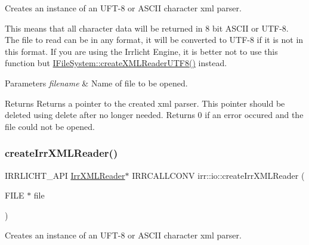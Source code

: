 Creates an instance of an U\+F\+T-\/8 or A\+S\+C\+II character xml parser. 

This means that all character data will be returned in 8 bit A\+S\+C\+II or U\+T\+F-\/8. The file to read can be in any format, it will be converted to U\+T\+F-\/8 if it is not in this format. If you are using the Irrlicht Engine, it is better not to use this function but \hyperlink{classirr_1_1io_1_1IFileSystem_affd8f622ac7c3dcd507f20f9cd23b21f}{I\+File\+System\+::create\+X\+M\+L\+Reader\+U\+T\+F8()} instead. 
\begin{DoxyParams}{Parameters}
{\em filename} & Name of file to be opened. \\
\hline
\end{DoxyParams}
\begin{DoxyReturn}{Returns}
Returns a pointer to the created xml parser. This pointer should be deleted using \textquotesingle{}delete\textquotesingle{} after no longer needed. Returns 0 if an error occured and the file could not be opened. 
\end{DoxyReturn}
\mbox{\label{namespaceirr_1_1io_a9c0ebca5a4addfcfd90f51b5131f7d56}} 
\subsubsection{\texorpdfstring{create\+Irr\+X\+M\+L\+Reader()}{createIrrXMLReader()}\hspace{0.1cm}{\footnotesize\ttfamily [2/3]}}
{\footnotesize\ttfamily I\+R\+R\+L\+I\+C\+H\+T\+\_\+\+A\+PI \hyperlink{namespaceirr_1_1io_a1628edbb9d5d53f18c82d2a92b0ad27e}{Irr\+X\+M\+L\+Reader}$\ast$ I\+R\+R\+C\+A\+L\+L\+C\+O\+NV irr\+::io\+::create\+Irr\+X\+M\+L\+Reader (\begin{DoxyParamCaption}\item[{F\+I\+LE $\ast$}]{file }\end{DoxyParamCaption})}



Creates an instance of an U\+F\+T-\/8 or A\+S\+C\+II character xml parser. 

